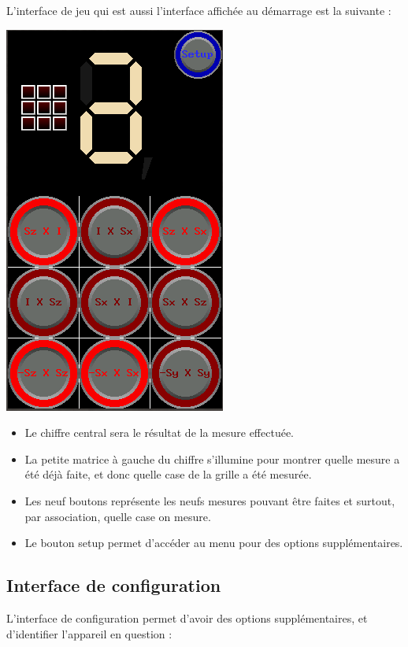 \documentclass[11pt]{article}
\begin{document}
L'interface de jeu qui est aussi l'interface affichée au démarrage est la suivante :

\includegraphics[]{Interface1.png}

\begin{itemize}
\item Le chiffre central sera le résultat de la mesure effectuée.
\item La petite matrice à gauche du chiffre s'illumine pour montrer quelle mesure a été déjà faite, et donc quelle case de la grille a été mesurée.
\item Les neuf boutons représente les neufs mesures pouvant être faites et surtout, par association, quelle case on mesure.
\item Le bouton setup permet d'accéder au menu pour des options supplémentaires.
\end{itemize}

\subsection{Interface de configuration}

L'interface de configuration permet d'avoir des options supplémentaires, et d'identifier l'appareil en question :
\end{document}
